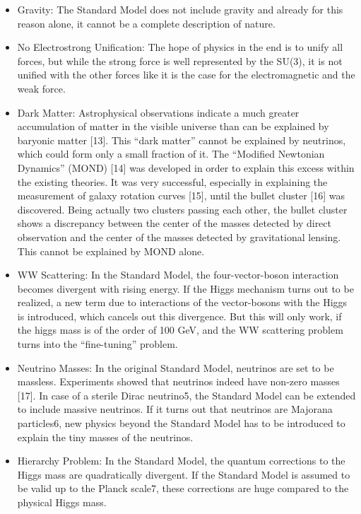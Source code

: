 \begin{itemize}
	\item Gravity: The Standard Model does not include gravity and already for this reason alone, it cannot be a complete description of nature.
	\item No Electrostrong Unification: The hope of physics in the end is to unify all forces, but while the strong force is well represented by the SU(3), it is not unified with the other forces like it is the case for the electromagnetic and the weak force.
	\item Dark Matter: Astrophysical observations indicate a much greater accumulation of matter in the visible universe than can be explained by baryonic matter [13]. This “dark matter” cannot be explained by neutrinos, which could form only a small fraction of it. The “Modified Newtonian Dynamics” (MOND) [14] was developed in order to explain this excess within the existing theories. It was very successful, especially in explaining the measurement of galaxy rotation curves [15], until the bullet cluster [16] was discovered. Being actually two clusters passing each other, the bullet cluster shows a discrepancy between the center of the masses detected by direct observation and the center of the masses detected by gravitational lensing. This cannot be explained by MOND alone.
	\item WW Scattering: In the Standard Model, the four-vector-boson interaction becomes divergent with rising energy. If the Higgs mechanism turns out to be realized, a new term due to interactions of the vector-bosons with the Higgs is introduced, which cancels out this divergence. But this will only work, if the higgs mass is of the order of 100 GeV, and the WW scattering problem turns into the “fine-tuning” problem.
	\item Neutrino Masses: In the original Standard Model, neutrinos are set to be massless. Experiments showed that neutrinos indeed have non-zero masses [17]. In case of a sterile Dirac neutrino5, the Standard Model can be extended to include massive neutrinos. If it turns out that neutrinos are Majorana particles6, new physics beyond the Standard Model has to be introduced to explain the tiny masses of the neutrinos.
	\item Hierarchy Problem: In the Standard Model, the quantum corrections to the Higgs mass are quadratically divergent. If the Standard Model is assumed to be valid up to the Planck scale7, these corrections are huge compared to the physical Higgs mass.
\end{itemize}

